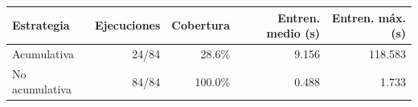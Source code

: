 \begin{tabular}{lrrrr}
\toprule
\textbf{Estrategia} & \textbf{Ejecuciones} & \textbf{Cobertura} & \textbf{Entren. medio (s)} & \textbf{Entren. máx. (s)} \\
\midrule
Acumulativa & 24/84 & 28.6\% & 9.156 & 118.583 \\
No acumulativa & 84/84 & 100.0\% & 0.488 & 1.733 \\
\bottomrule
\end{tabular}
